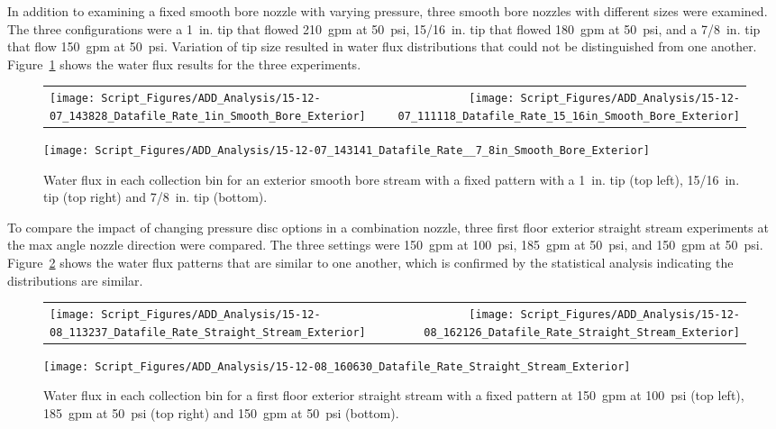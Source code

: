 \documentclass[12pt,oneside]{book}
\begin{document}
\clearpage

In addition to examining a fixed smooth bore nozzle with varying pressure, three smooth bore nozzles with different sizes were examined. The three configurations were a 1~in. tip that flowed 210~gpm at 50~psi, 15/16~in. tip that flowed 180~gpm at 50~psi, and a 7/8~in. tip that flow 150~gpm at 50~psi. Variation of tip size resulted in water flux distributions that could not be distinguished from one another. Figure~\ref{fig:Exterior_Second_Floor_Varying_Flow_Rates_SB_Fixed_Pattern} shows the water flux results for the three experiments.

\begin{figure}[ht]
\begin{tabular*}{\textwidth}{lr}
\texttt{[image: Script\_Figures/ADD\_Analysis/15-12-07\_143828\_Datafile\_Rate\_1in\_Smooth\_Bore\_Exterior]} &
\texttt{[image: Script\_Figures/ADD\_Analysis/15-12-07\_111118\_Datafile\_Rate\_15\_16in\_Smooth\_Bore\_Exterior]} \\
\end{tabular*}
\centering
\texttt{[image: Script\_Figures/ADD\_Analysis/15-12-07\_143141\_Datafile\_Rate\_\_7\_8in\_Smooth\_Bore\_Exterior]}
\caption[Water Flux Varying Tip Size for Smooth Bore Nozzle]{Water flux in each collection bin for an exterior smooth bore stream with a fixed pattern with a 1~in. tip (top left), 15/16~in. tip (top right) and 7/8~in. tip (bottom).}
\label{fig:Exterior_Second_Floor_Varying_Flow_Rates_SB_Fixed_Pattern}
\end{figure}

To compare the impact of changing pressure disc options in a combination nozzle, three first floor exterior straight stream experiments at the max angle nozzle direction were compared. The three settings were 150~gpm at 100~psi, 185~gpm at 50~psi, and 150~gpm at 50~psi. Figure~\ref{fig:Exterior_First_Floor_Varying_Nozzle_Pressure_SS_Fixed_Pattern} shows the water flux patterns that are similar to one another, which is confirmed by the statistical analysis indicating the distributions are similar.   

\begin{figure}[ht]
\begin{tabular*}{\textwidth}{lr}
\texttt{[image: Script\_Figures/ADD\_Analysis/15-12-08\_113237\_Datafile\_Rate\_Straight\_Stream\_Exterior]} & 
\texttt{[image: Script\_Figures/ADD\_Analysis/15-12-08\_162126\_Datafile\_Rate\_Straight\_Stream\_Exterior]} \\
\end{tabular*}
\centering
\texttt{[image: Script\_Figures/ADD\_Analysis/15-12-08\_160630\_Datafile\_Rate\_Straight\_Stream\_Exterior]}  
\caption[Water Flux Varying Pressure Discs in Combination Nozzle]{Water flux in each collection bin for a first floor exterior straight stream with a fixed pattern at 150~gpm at 100~psi (top left), 185~gpm at 50~psi (top right) and 150~gpm at 50~psi (bottom).}
\label{fig:Exterior_First_Floor_Varying_Nozzle_Pressure_SS_Fixed_Pattern}
\end{figure}
\end{document}

